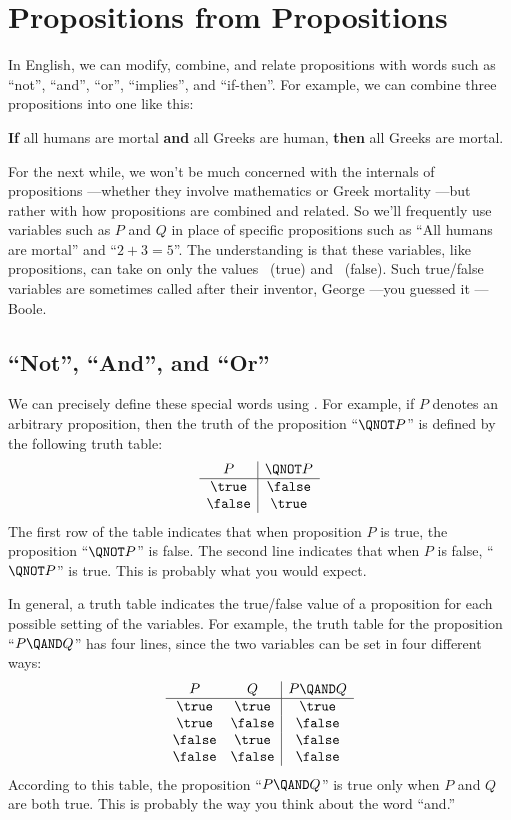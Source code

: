 \section{Propositions from Propositions}

In English, we can modify, combine, and relate propositions with words
such as ``not'', ``and'', ``or'', ``implies'', and ``if-then''.
For example, we can combine three propositions into one like this:
%
\begin{center}
\textbf{If} all humans are mortal \textbf{and} all Greeks are human,
\textbf{then} all Greeks are mortal.
\end{center}

For the next while, we won't be much concerned with the internals of
propositions ---whether they involve mathematics or Greek mortality ---but
rather with how propositions are combined and related.  So we'll
frequently use variables such as $P$ and $Q$ in place of specific
propositions such as ``All humans are mortal'' and ``$2 + 3 = 5$''.  The
understanding is that these variables, like propositions, can take on only
the values \true ~(true) and \false ~(false).  Such true/false variables are
sometimes called  after their inventor, George
---you guessed it ---Boole.

\subsection{``Not'', ``And'', and ``Or''}

We can precisely define these special words using .
For example, if $P$ denotes an arbitrary proposition, then the
truth of the proposition ``$\QNOT P$'' is defined by the following
truth table:
%
\[
\begin{array}{c|c}
P & \QNOT P \\ \hline
\true & \false \\
\false & \true \\
\end{array}
\]
%
The first row of the table indicates that when proposition $P$ is true,
the proposition ``$\QNOT P$'' is false.  The second line indicates that
when $P$ is false, ``$\QNOT P$'' is true.  This is probably what you would
expect.

In general, a truth table indicates the true/false value of a proposition
for each possible setting of the variables.  For example, the truth table
for the proposition ``$P \QAND Q$'' has four lines, since the two
variables can be set in four different ways:
%
\[
\begin{array}{cc|c}
P & Q & P \QAND Q \\ \hline
\true & \true & \true \\
\true & \false & \false \\
\false & \true & \false \\
\false & \false & \false
\end{array}
\]
%
According to this table, the proposition ``$P \QAND Q$'' is true only when
$P$ and $Q$ are both true.  This is probably the way you think about the
word ``and.''

